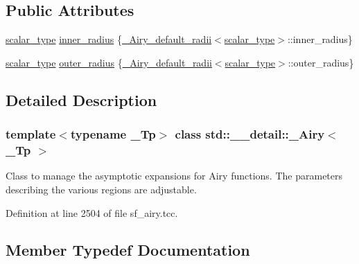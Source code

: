 \subsection*{Public Attributes}
\begin{DoxyCompactItemize}
\item 
\hyperlink{classstd_1_1____detail_1_1__Airy_a266cdfcc86b36c8743fd0e102387e1f0}{scalar\+\_\+type} \hyperlink{classstd_1_1____detail_1_1__Airy_ae619970f4c54b7f80340f05b7ead83e1}{inner\+\_\+radius} \{\hyperlink{structstd_1_1____detail_1_1__Airy__default__radii}{\+\_\+\+Airy\+\_\+default\+\_\+radii}$<$\hyperlink{classstd_1_1____detail_1_1__Airy_a266cdfcc86b36c8743fd0e102387e1f0}{scalar\+\_\+type}$>$\+::inner\+\_\+radius\}
\item 
\hyperlink{classstd_1_1____detail_1_1__Airy_a266cdfcc86b36c8743fd0e102387e1f0}{scalar\+\_\+type} \hyperlink{classstd_1_1____detail_1_1__Airy_af688e5d14ed305f95f0e9d9d58d3bf9a}{outer\+\_\+radius} \{\hyperlink{structstd_1_1____detail_1_1__Airy__default__radii}{\+\_\+\+Airy\+\_\+default\+\_\+radii}$<$\hyperlink{classstd_1_1____detail_1_1__Airy_a266cdfcc86b36c8743fd0e102387e1f0}{scalar\+\_\+type}$>$\+::outer\+\_\+radius\}
\end{DoxyCompactItemize}


\subsection{Detailed Description}
\subsubsection*{template$<$typename \+\_\+\+Tp$>$\newline
class std\+::\+\_\+\+\_\+detail\+::\+\_\+\+Airy$<$ \+\_\+\+Tp $>$}

Class to manage the asymptotic expansions for Airy functions. The parameters describing the various regions are adjustable. 

Definition at line 2504 of file sf\+\_\+airy.\+tcc.



\subsection{Member Typedef Documentation}
\mbox{\label{classstd_1_1____detail_1_1__Airy_a266cdfcc86b36c8743fd0e102387e1f0}} 
